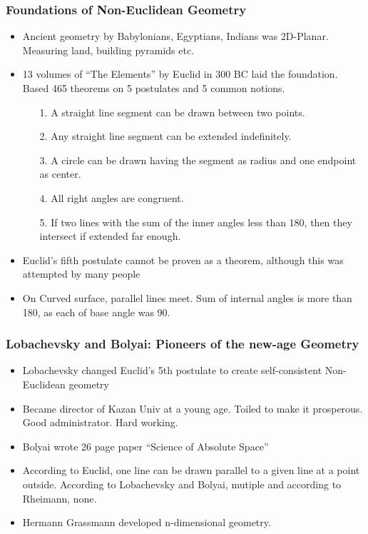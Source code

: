 \begin{frame}[fragile]
\frametitle{Foundations of Non-Euclidean Geometry}
\begin{itemize}[label=\textbullet,noitemsep,nolistsep,leftmargin=*]
\item Ancient geometry by Babylonians, Egyptians, Indians was 2D-Planar. Measuring land, building pyramids etc.
\item 13 volumes of ``The Elements'' by Euclid in 300 BC laid the foundation. Based 465 theorems on 5 postulates and 5 common notions. %
	\begin{itemize}
	\item[1.] A straight line segment can be drawn between two points.
	\item[2.] Any straight line segment can be extended indefinitely.
	\item[3.] A circle can be drawn having the segment as radius and one endpoint as center.
	\item [4.] All right angles are congruent.
	\item [5.] If two lines with the sum of the inner angles less than 180, then they intersect if extended far enough.
	\end{itemize}
\item 
Euclid's fifth postulate cannot be proven as a theorem, although this was attempted by many people
\item On Curved surface, parallel lines meet. Sum of internal angles is more than 180, as each of base angle was 90.
\end{itemize}
\end{frame}

\begin{frame}[fragile]
\frametitle{Lobachevsky and Bolyai: Pioneers of the new-age Geometry}
\begin{itemize}[label=\textbullet,noitemsep,nolistsep]
\item Lobachevsky changed Euclid's 5th postulate to create self-consistent Non-Euclidean geometry
\item Became director of Kazan Univ at a young age. Toiled to make it prosperous. Good administrator. Hard working.
\item  Bolyai wrote 26 page paper ``Science of Absolute Space''
\item According to Euclid, one line can be drawn parallel to a given line at a point outside. According to Lobachevsky and Bolyai, mutiple and according to Rheimann, none.
\item Hermann Grassmann developed n-dimensional geometry.
\end{itemize}
\end{frame}



